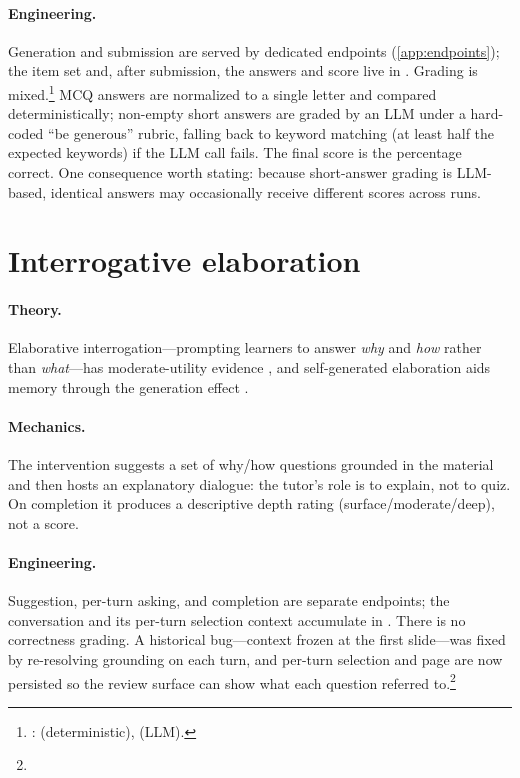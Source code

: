 \paragraph{Engineering.} Generation and submission are served by dedicated
endpoints (\cref{app:endpoints}); the item set and, after submission, the
answers and score live in . Grading is
mixed.\footnote{: 
(deterministic),  (LLM).} MCQ answers are
normalized to a single letter and compared deterministically; non-empty
short answers are graded by an LLM under a hard-coded ``be generous''
rubric, falling back to keyword matching (at least half the expected
keywords) if the LLM call fails. The final score is the percentage
correct. One consequence worth stating: because short-answer grading is
LLM-based, identical answers may occasionally receive different scores
across runs.

\section{Interrogative elaboration}
\label{sec:interventions-ie}

\paragraph{Theory.} Elaborative interrogation---prompting learners to
answer \emph{why} and \emph{how} rather than \emph{what}---has
moderate-utility evidence \citep{dunlosky2013}, and self-generated
elaboration aids memory through the generation effect
\citep{pressley1987}.

\paragraph{Mechanics.} The intervention suggests a set of why/how
questions grounded in the material and then hosts an explanatory
dialogue: the tutor's role is to explain, not to quiz. On completion it
produces a descriptive depth rating (surface/moderate/deep), not a score.

\paragraph{Engineering.} Suggestion, per-turn asking, and completion are
separate endpoints; the conversation and its per-turn selection context
accumulate in . There is no correctness grading. A
historical bug---context frozen at the first slide---was fixed by
re-resolving grounding on each turn, and per-turn selection and page are
now persisted so the review surface can show what each question referred
to.\footnote{}

